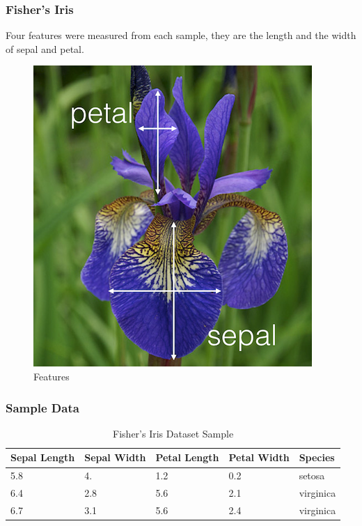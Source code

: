 \documentclass{beamer}
\begin{document}
\begin{frame}
\frametitle{Fisher's Iris}
Four features were measured from each
sample, they are the length and the width of sepal and petal.
\begin{figure}[htbp]
\centering
\includegraphics[scale=.35]{graphics/iris_feature} \caption{Features}
\label{fig:Features}
\end{figure}
\end{frame}
\begin{frame}
\frametitle{Sample Data}
\begin{table}
\begin{tabular}{lllll}
\hline
\textbf{Sepal Length} & \textbf{ Sepal Width } & \textbf{Petal Length} & \textbf{Petal Width} & \textbf{Species}\\
\hline
5.8 & 4.   & 1.2 & 0.2 & setosa\\
6.4 & 2.8 & 5.6 & 2.1 & virginica\\
6.7 & 3.1 & 5.6 & 2.4 & virginica \\
\hline
\end{tabular}
\caption{Fisher's Iris Dataset Sample}
\end{table}
\end{frame}
\end{document}

